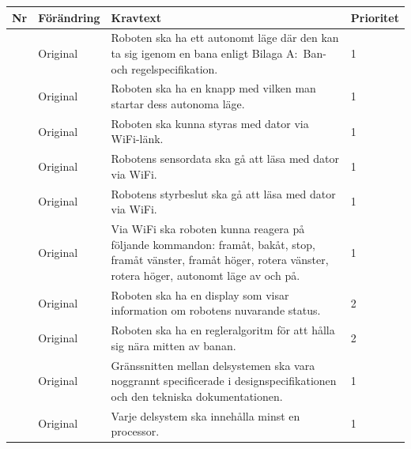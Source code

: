 \documentclass[a4paper,titlepage,12pt]{article}
\newcounter{reqNr}
\newcommand{\nextReqNr}{\stepcounter{reqNr}\arabic{reqNr}}
\begin{document}
		\begin{longtable}[c]{ c l>{\raggedright}p{} l }
			\textbf{Nr} & \textbf{Förändring} & \textbf{Kravtext} & \textbf{Prioritet} 
				\\ \midrule
	
			\nextReqNr{} & Original & Roboten ska ha ett autonomt läge där den kan ta
					sig igenom en bana enligt Bilaga A:\ Ban- och regelspecifikation. & 1
					\\ \midrule

			\nextReqNr{} & Original & Roboten ska ha en knapp med vilken man startar 
				dess autonoma läge. & 1
				\\ \midrule

			\nextReqNr{} & Original & Roboten ska kunna styras med dator 
				via WiFi-länk. & 1
				\\ \midrule
		
			\nextReqNr{} & Original & Robotens sensordata ska gå att läsa 
				med dator via WiFi. & 1
				\\ \midrule

			\nextReqNr{} & Original & Robotens styrbeslut ska gå att läsa 
				med dator via WiFi. & 1
                \\ \midrule
      
			\nextReqNr{} & Original & Via WiFi ska roboten kunna reagera på följande
				kommandon: framåt, bakåt, stop, framåt vänster,
				framåt höger, rotera vänster, rotera höger,
				autonomt läge av och på. & 1
				\\ \midrule

			\nextReqNr{} & Original & Roboten ska ha en display som visar information
				om robotens nuvarande status. & 2
				\\ \midrule

			\nextReqNr{} & Original & Roboten ska ha en regleralgoritm för att hålla sig
				nära mitten av banan. & 2
				\\ \midrule

            \nextReqNr{} & Original & Gränssnitten
            mellan delsystemen ska vara noggrannt specificerade i
            designspecifikationen och den tekniska dokumentationen. & 1
                \\ \midrule

            \nextReqNr{} & Original & Varje delsystem
            ska innehålla minst en processor. & 1
				\\ 
		\end{longtable}
\end{document}
